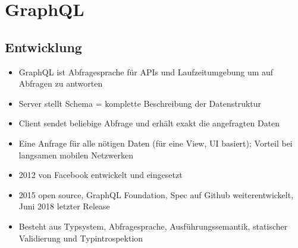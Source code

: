 \chapter{GraphQL}

\section{Entwicklung}
\begin{itemize}
  \item GraphQL ist Abfragesprache für APIs und Laufzeitumgebung um auf Abfragen zu antworten
  \item Server stellt Schema = komplette Beschreibung der Datenstruktur
  \item Client sendet beliebige Abfrage und erhält exakt die angefragten Daten
  \item Eine Anfrage für alle nötigen Daten (für eine View, UI basiert); Vorteil bei langsamen mobilen Netzwerken
  \item 2012 von Facebook entwickelt und eingesetzt
  \item 2015 open source, GraphQL Foundation, Spec auf Github weiterentwickelt, Juni 2018 letzter Release
  \item Besteht aus Typsystem, Abfragesprache, Ausführungssemantik, statischer Validierung und Typintrospektion
\end{itemize}

